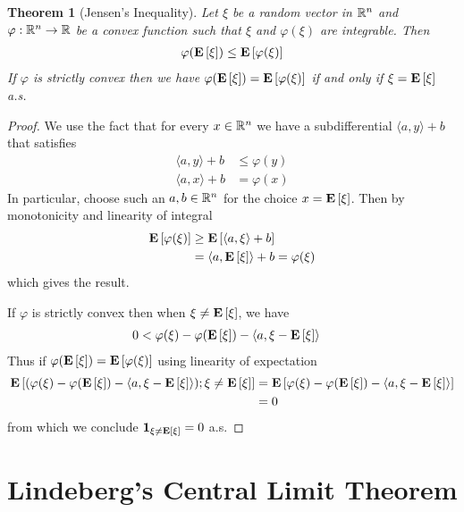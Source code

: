 \documentclass{amsart}
\newtheorem{thm}{Theorem}[section]
\theoremstyle{remark}
\theoremstyle{definition}
\begin{document}
\begin{thm}[Jensen's Inequality]\label{Jensen}Let $\xi$ be a random vector in $\mathbb{R}^n$
  and $\varphi : \mathbb{R}^n \to \mathbb{R}$ be a convex function such that
  $\xi$ and $\varphi(\xi)$ are integrable.  Then 
\begin{align*}
\varphi(\textbf{E}\left[\xi\right]) \leq \textbf{E}\left[\varphi(\xi)\right]
\end{align*}
If $\varphi$ is strictly convex then we have $\varphi(\textbf{E}\left[\xi\right]) = \textbf{E}\left[\varphi(\xi)\right]$ if and only if $\xi =
\textbf{E}\left[\xi\right]$ a.s.
\end{thm}
\begin{proof}We use the fact that for every $x \in \mathbb{R}^n$ we have a
  subdifferential $\langle a, y \rangle + b$ that satisfies
\begin{align*}
\langle a, y \rangle + b &\leq \varphi(y) \\
\langle a,x \rangle + b &= \varphi(x)
\end{align*}
In particular, choose such an $a,b \in \mathbb{R}^n$ for the choice $x =
\textbf{E}\left[\xi\right]$.  Then by monotonicity and linearity of integral
\begin{align*}
\textbf{E}\left[\varphi(\xi)\right] &\geq \textbf{E}\left[\langle a, \xi\rangle +
  b\right] \\
&= \langle a, \textbf{E}\left[\xi\right] \rangle + b = \varphi(\xi)
\end{align*}
which gives the result.

If $\varphi$ is strictly convex then when $\xi \neq \textbf{E}\left[\xi\right]$,
we have 
\begin{align*}
0 &< \varphi(\xi) - \varphi(\textbf{E}\left[\xi\right]) - \langle a , \xi -
\textbf{E}\left[\xi\right] \rangle
\end{align*}  Thus if $\varphi(\textbf{E}\left[\xi\right]) =
\textbf{E}\left[\varphi(\xi)\right]$ using linearity of expectation
\begin{align*}
\textbf{E}\left[ (\varphi(\xi) - \varphi(\textbf{E}\left[\xi\right]) - \langle a , \xi -
\textbf{E}\left[\xi\right]\rangle); \xi \neq \textbf{E}\left[\xi\right]\right] &= \textbf{E}\left[\varphi(\xi) - \varphi(\textbf{E}\left[\xi\right]) - \langle a , \xi -
\textbf{E}\left[\xi\right]\rangle\right] \\
&=0
\end{align*}
from which we conclude $\textbf{1}_{\xi \neq \textbf{E}\left[\xi\right]} = 0$ a.s.
\end{proof}





\section{Lindeberg's Central Limit Theorem}
\end{document}
